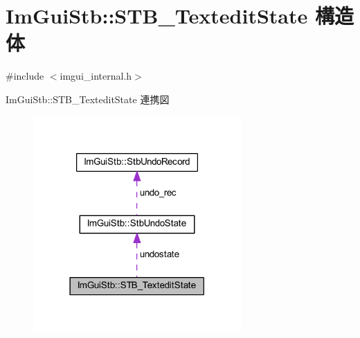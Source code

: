 \hypertarget{struct_im_gui_stb_1_1_s_t_b___textedit_state}{}\section{Im\+Gui\+Stb\+:\+:S\+T\+B\+\_\+\+Textedit\+State 構造体}
\label{struct_im_gui_stb_1_1_s_t_b___textedit_state}


{\ttfamily \#include $<$imgui\+\_\+internal.\+h$>$}



Im\+Gui\+Stb\+:\+:S\+T\+B\+\_\+\+Textedit\+State 連携図\nopagebreak
\begin{figure}[H]
\begin{center}
\leavevmode
\includegraphics[width=225pt]{struct_im_gui_stb_1_1_s_t_b___textedit_state__coll__graph}
\end{center}
\end{figure}
